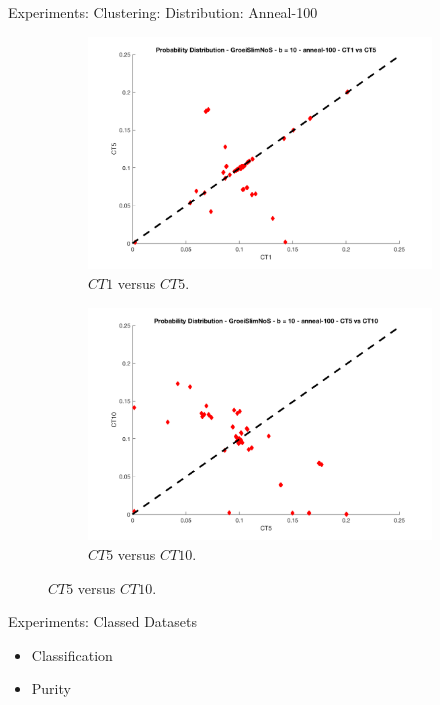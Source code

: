 \documentclass{beamer}
\newcommand{\codetable}{CT}
\begin{document}
\begin{frame}{Experiments: Clustering: Distribution: Anneal-100}
\begin{figure}
  \centering
  \begin{subfigure}[b]{0.45\textwidth}
    \includegraphics[width=\textwidth]{img/proba-anneal-1-5}
    \caption{$\codetable 1$ versus $\codetable 5$.}
  \end{subfigure}
  \begin{subfigure}[b]{0.45\textwidth}
    \includegraphics[width=\textwidth]{img/proba-anneal-5-10}
    \caption{$\codetable 5$ versus $\codetable 10$.}
  \end{subfigure} 
\end{figure}
\end{frame}

\begin{frame}{Experiments: Classed Datasets}
	\begin{itemize}
		\item Classification
		\item Purity
	\end{itemize}
\end{frame}
\end{document}
